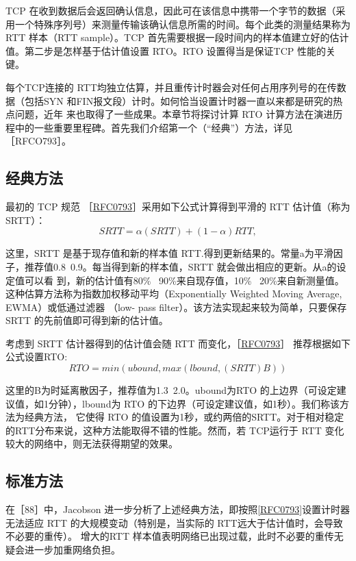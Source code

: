 TCP 在收到数据后会返回确认信息，因此可在该信息中携带一个字节的数据（采用一个特殊序列号）来测量传输该确认信息所需的时间。每个此类的测量结果称为 RTT 样本（RTT
sample）。TCP 首先需要根据一段时间内的样本值建立好的估计值。第二步是怎样基于估计值设置 RTO。RTO 设置得当是保证TCP 性能的关键。

每个TCP连接的 RTT均独立估算，并且重传计时器会对任何占用序列号的在传数据（包括SYN 和FIN报文段）计时。如何恰当设置计时器一直以来都是研究的热点问题，近年
来也取得了一些成果。本章节将探讨计算 RTO 计算方法在演进历程中的一些重要里程碑。首先我们介绍第一个（“经典”）方法，详见［RFCO793］。

\subsection{经典方法}
最初的 TCP 规范 ［\href{https://datatracker.ietf.org/doc/html/rfc0793#section-3.7}{RFC0793}］采用如下公式计算得到平滑的 RTT 估计值（称为 SRTT）：
\begin{equation}
    SRTT = \alpha(SRTT) + (1 - \alpha) RTT,
\end{equation}

这里，SRTT 是基于现存值和新的样本值 RTT.得到更新结果的。常量a为平滑因子，推荐值0.8~0.9。每当得到新的样本值，SRTT 就会做出相应的更新。从a的设定值可以看
到，新的估计值有80\% ~90\%来自现存值，10\% ~20\%来自新测量值。这种估算方法称为指数加权移动平均（Exponentially Weighted Moving Average, EWMA）或低通过滤器 （low-
pass filter）。该方法实现起来较为简单，只要保存SRTT 的先前值即可得到新的估计值。

考虑到 SRTT 估计器得到的估计值会随 RTT 而变化，［\href{https://datatracker.ietf.org/doc/html/rfc0793#section-3.7}{RFC0793}］ 推荐根据如下公式设置RTO:
\begin{equation}
    RTO = min(ubound, max(lbound, (SRTT)B))
\end{equation}

这里的B为时延离散因子，推荐值为1.3~2.0。ubound为RTO 的上边界（可设定建议值，如1分钟），lbound为 RTO 的下边界（可设定建议值，如1秒）。我们称该方法为经典方法，
它使得 RTO 的值设置为1秒，或约两倍的SRTT。对于相对稳定的RTT分布来说，这种方法能取得不错的性能。然而，若 TCP运行于 RTT 变化较大的网络中，则无法获得期望的效果。

\subsection{标准方法}
在［88］中，Jacobson 进一步分析了上述经典方法，即按照\href{https://www.rfc-editor.org/rfc/rfc0793}{[RFC0793]}设置计时器无法适应 RTT 的大规模变动（特别是，当实际的 RTT远大于估计值时，会导致不必要的重传）。
增大的RTT 样本值表明网络已出现过载，此时不必要的重传无疑会进一步加重网络负担。

